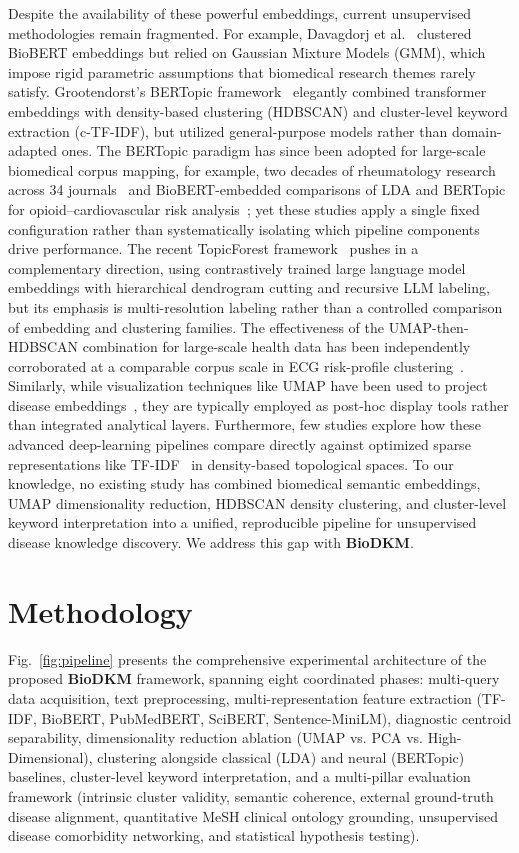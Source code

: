 \documentclass[a4paper,10pt,conference]{IEEEtran}
\begin{document}
Despite the availability of these powerful embeddings, current unsupervised methodologies remain fragmented. For example, Davagdorj et al.~\cite{ref15} clustered BioBERT embeddings but relied on Gaussian Mixture Models (GMM), which impose rigid parametric assumptions that biomedical research themes rarely satisfy. Grootendorst's BERTopic framework~\cite{ref17} elegantly combined transformer embeddings with density-based clustering (HDBSCAN) and cluster-level keyword extraction (c-TF-IDF), but utilized general-purpose models rather than domain-adapted ones. The BERTopic paradigm has since been adopted for large-scale biomedical corpus mapping, for example, two decades of rheumatology research across 34 journals~\cite{ref30} and BioBERT-embedded comparisons of LDA and BERTopic for opioid--cardiovascular risk analysis~\cite{ref31}; yet these studies apply a single fixed configuration rather than systematically isolating which pipeline components drive performance. The recent TopicForest framework~\cite{ref29} pushes in a complementary direction, using contrastively trained large language model embeddings with hierarchical dendrogram cutting and recursive LLM labeling, but its emphasis is multi-resolution labeling rather than a controlled comparison of embedding and clustering families. The effectiveness of the UMAP-then-HDBSCAN combination for large-scale health data has been independently corroborated at a comparable corpus scale in ECG risk-profile clustering~\cite{ref32}. Similarly, while visualization techniques like UMAP have been used to project disease embeddings~\cite{ref11,ref19,ref20}, they are typically employed as post-hoc display tools rather than integrated analytical layers. Furthermore, few studies explore how these advanced deep-learning pipelines compare directly against optimized sparse representations like TF-IDF~\cite{ref18} in density-based topological spaces. To our knowledge, no existing study has combined biomedical semantic embeddings, UMAP dimensionality reduction, HDBSCAN density clustering, and cluster-level keyword interpretation into a unified, reproducible pipeline for unsupervised disease knowledge discovery. We address this gap with \textbf{BioDKM}.

\section{Methodology}

Fig.~\ref{fig:pipeline} presents the comprehensive experimental architecture of the proposed \textbf{BioDKM} framework, spanning eight coordinated phases: multi-query data acquisition, text preprocessing, multi-representation feature extraction (TF-IDF, BioBERT, PubMedBERT, SciBERT, Sentence-MiniLM), diagnostic centroid separability, dimensionality reduction ablation (UMAP vs. PCA vs. High-Dimensional), clustering alongside classical (LDA) and neural (BERTopic) baselines, cluster-level keyword interpretation, and a multi-pillar evaluation framework (intrinsic cluster validity, semantic coherence, external ground-truth disease alignment, quantitative MeSH clinical ontology grounding, unsupervised disease comorbidity networking, and statistical hypothesis testing).
\end{document}
